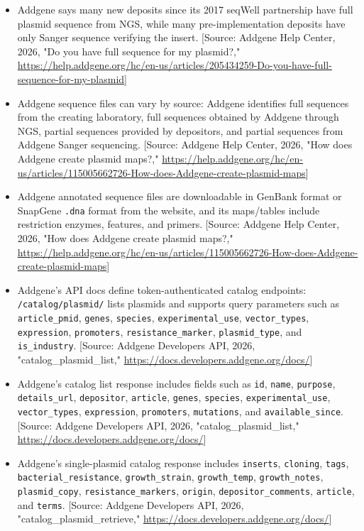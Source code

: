 \documentclass[11pt]{report}
\begin{document}
\begin{itemize}
\item Addgene says many new deposits since its 2017 seqWell partnership have full plasmid sequence from NGS, while many pre-implementation deposits have only Sanger sequence verifying the insert. [Source: Addgene Help Center, 2026, "Do you have full sequence for my plasmid?," \url{https://help.addgene.org/hc/en-us/articles/205434259-Do-you-have-full-sequence-for-my-plasmid}]
\item Addgene sequence files can vary by source: Addgene identifies full sequences from the creating laboratory, full sequences obtained by Addgene through NGS, partial sequences provided by depositors, and partial sequences from Addgene Sanger sequencing. [Source: Addgene Help Center, 2026, "How does Addgene create plasmid maps?," \url{https://help.addgene.org/hc/en-us/articles/115005662726-How-does-Addgene-create-plasmid-maps}]
\item Addgene annotated sequence files are downloadable in GenBank format or SnapGene \texttt{.dna} format from the website, and its maps/tables include restriction enzymes, features, and primers. [Source: Addgene Help Center, 2026, "How does Addgene create plasmid maps?," \url{https://help.addgene.org/hc/en-us/articles/115005662726-How-does-Addgene-create-plasmid-maps}]
\item Addgene's API docs define token-authenticated catalog endpoints: \texttt{/catalog/plasmid/} lists plasmids and supports query parameters such as \texttt{article\_pmid}, \texttt{genes}, \texttt{species}, \texttt{experimental\_use}, \texttt{vector\_types}, \texttt{expression}, \texttt{promoters}, \texttt{resistance\_marker}, \texttt{plasmid\_type}, and \texttt{is\_industry}. [Source: Addgene Developers API, 2026, "catalog\_plasmid\_list," \url{https://docs.developers.addgene.org/docs/}]
\item Addgene's catalog list response includes fields such as \texttt{id}, \texttt{name}, \texttt{purpose}, \texttt{details\_url}, \texttt{depositor}, \texttt{article}, \texttt{genes}, \texttt{species}, \texttt{experimental\_use}, \texttt{vector\_types}, \texttt{expression}, \texttt{promoters}, \texttt{mutations}, and \texttt{available\_since}. [Source: Addgene Developers API, 2026, "catalog\_plasmid\_list," \url{https://docs.developers.addgene.org/docs/}]
\item Addgene's single-plasmid catalog response includes \texttt{inserts}, \texttt{cloning}, \texttt{tags}, \texttt{bacterial\_resistance}, \texttt{growth\_strain}, \texttt{growth\_temp}, \texttt{growth\_notes}, \texttt{plasmid\_copy}, \texttt{resistance\_markers}, \texttt{origin}, \texttt{depositor\_comments}, \texttt{article}, and \texttt{terms}. [Source: Addgene Developers API, 2026, "catalog\_plasmid\_retrieve," \url{https://docs.developers.addgene.org/docs/}]

\end{itemize}
\end{document}
